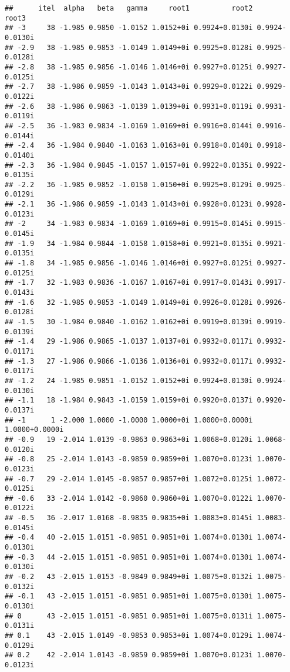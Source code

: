 \documentclass[
  12pt,
]{article}
\begin{document}
\begin{verbatim}
##      itel  alpha   beta   gamma     root1          root2          root3
## -3     38 -1.985 0.9850 -1.0152 1.0152+0i 0.9924+0.0130i 0.9924-0.0130i
## -2.9   38 -1.985 0.9853 -1.0149 1.0149+0i 0.9925+0.0128i 0.9925-0.0128i
## -2.8   38 -1.985 0.9856 -1.0146 1.0146+0i 0.9927+0.0125i 0.9927-0.0125i
## -2.7   38 -1.986 0.9859 -1.0143 1.0143+0i 0.9929+0.0122i 0.9929-0.0122i
## -2.6   38 -1.986 0.9863 -1.0139 1.0139+0i 0.9931+0.0119i 0.9931-0.0119i
## -2.5   36 -1.983 0.9834 -1.0169 1.0169+0i 0.9916+0.0144i 0.9916-0.0144i
## -2.4   36 -1.984 0.9840 -1.0163 1.0163+0i 0.9918+0.0140i 0.9918-0.0140i
## -2.3   36 -1.984 0.9845 -1.0157 1.0157+0i 0.9922+0.0135i 0.9922-0.0135i
## -2.2   36 -1.985 0.9852 -1.0150 1.0150+0i 0.9925+0.0129i 0.9925-0.0129i
## -2.1   36 -1.986 0.9859 -1.0143 1.0143+0i 0.9928+0.0123i 0.9928-0.0123i
## -2     34 -1.983 0.9834 -1.0169 1.0169+0i 0.9915+0.0145i 0.9915-0.0145i
## -1.9   34 -1.984 0.9844 -1.0158 1.0158+0i 0.9921+0.0135i 0.9921-0.0135i
## -1.8   34 -1.985 0.9856 -1.0146 1.0146+0i 0.9927+0.0125i 0.9927-0.0125i
## -1.7   32 -1.983 0.9836 -1.0167 1.0167+0i 0.9917+0.0143i 0.9917-0.0143i
## -1.6   32 -1.985 0.9853 -1.0149 1.0149+0i 0.9926+0.0128i 0.9926-0.0128i
## -1.5   30 -1.984 0.9840 -1.0162 1.0162+0i 0.9919+0.0139i 0.9919-0.0139i
## -1.4   29 -1.986 0.9865 -1.0137 1.0137+0i 0.9932+0.0117i 0.9932-0.0117i
## -1.3   27 -1.986 0.9866 -1.0136 1.0136+0i 0.9932+0.0117i 0.9932-0.0117i
## -1.2   24 -1.985 0.9851 -1.0152 1.0152+0i 0.9924+0.0130i 0.9924-0.0130i
## -1.1   18 -1.984 0.9843 -1.0159 1.0159+0i 0.9920+0.0137i 0.9920-0.0137i
## -1      1 -2.000 1.0000 -1.0000 1.0000+0i 1.0000+0.0000i 1.0000+0.0000i
## -0.9   19 -2.014 1.0139 -0.9863 0.9863+0i 1.0068+0.0120i 1.0068-0.0120i
## -0.8   25 -2.014 1.0143 -0.9859 0.9859+0i 1.0070+0.0123i 1.0070-0.0123i
## -0.7   29 -2.014 1.0145 -0.9857 0.9857+0i 1.0072+0.0125i 1.0072-0.0125i
## -0.6   33 -2.014 1.0142 -0.9860 0.9860+0i 1.0070+0.0122i 1.0070-0.0122i
## -0.5   36 -2.017 1.0168 -0.9835 0.9835+0i 1.0083+0.0145i 1.0083-0.0145i
## -0.4   40 -2.015 1.0151 -0.9851 0.9851+0i 1.0074+0.0130i 1.0074-0.0130i
## -0.3   44 -2.015 1.0151 -0.9851 0.9851+0i 1.0074+0.0130i 1.0074-0.0130i
## -0.2   43 -2.015 1.0153 -0.9849 0.9849+0i 1.0075+0.0132i 1.0075-0.0132i
## -0.1   43 -2.015 1.0151 -0.9851 0.9851+0i 1.0075+0.0130i 1.0075-0.0130i
## 0      43 -2.015 1.0151 -0.9851 0.9851+0i 1.0075+0.0131i 1.0075-0.0131i
## 0.1    43 -2.015 1.0149 -0.9853 0.9853+0i 1.0074+0.0129i 1.0074-0.0129i
## 0.2    42 -2.014 1.0143 -0.9859 0.9859+0i 1.0070+0.0123i 1.0070-0.0123i

\end{verbatim}
\end{document}
